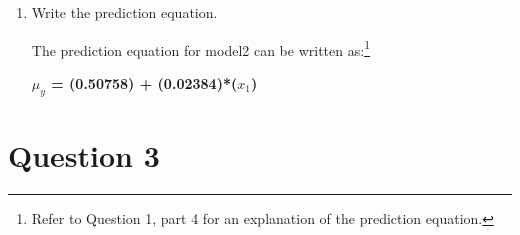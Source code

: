 \documentclass[12pt,letterpaper]{article}
\begin{document}
\begin{enumerate}
		\vspace{4cm}
		\item Write the prediction equation.
		
		\vspace{0.1cm}
		
		The prediction equation for model2 can be written as:\footnote{Refer to Question 1, part 4 for an explanation of the  prediction equation.}
		
		\vspace{0.1cm}
		
		\textbf{$\mu_y$ = (0.50758) + (0.02384)*($x_1$)}
	\end{enumerate}
	
	\newpage	
\section*{Question 3}
\end{document}
